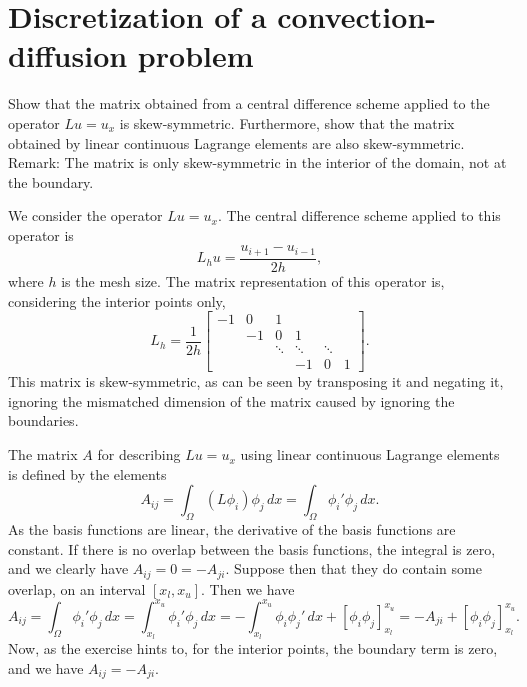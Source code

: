\section{Discretization of a convection-diffusion problem}

\begin{exercise}
    Show that the matrix obtained from a central difference scheme applied to the operator $L u = u_x$ is skew-symmetric.
    Furthermore, show that the matrix obtained by linear continuous Lagrange elements are also skew-symmetric.
    Remark: The matrix is only skew-symmetric in the interior of the domain, not at the boundary.
\end{exercise}

\begin{solution}
    We consider the operator $L u = u_x$.
    The central difference scheme applied to this operator is
    \begin{equation*}
        L_h u = \frac{u_{i+1} - u_{i-1}}{2h},
    \end{equation*}
    where $h$ is the mesh size.
    The matrix representation of this operator is, considering the interior points only,
    \begin{equation*}
        L_h = \frac{1}{2h}
        \begin{bmatrix}
            -1 & 0 & 1 \\
            & -1 & 0 & 1 \\
            && \ddots & \ddots & \ddots \\
            &&& -1 & 0 & 1
        \end{bmatrix}.
    \end{equation*}
    This matrix is skew-symmetric, as can be seen by transposing it and negating it, ignoring the mismatched dimension of the matrix caused by ignoring the boundaries.

    The matrix $A$ for describing $L u = u_x$ using linear continuous Lagrange elements is defined by the elements
    \begin{equation*}
        A_{ij}
        = \int_{\Omega} (L \phi_i) \phi_j \, dx
        = \int_{\Omega} \phi_i' \phi_j \, dx.
    \end{equation*}
    As the basis functions are linear, the derivative of the basis functions are constant.
    If there is no overlap between the basis functions, the integral is zero, and we clearly have $A_{ij} = 0 = -A_{ji}$.
    Suppose then that they do contain some overlap, on an interval $[x_l, x_u]$.
    Then we have
    \begin{equation*}
        A_{ij} = \int_{\Omega} \phi_i' \phi_j \, dx = \int_{x_l}^{x_u} \phi_i' \phi_j \, dx = -\int_{x_l}^{x_u} \phi_i \phi_j' \, dx + \left[ \phi_i \phi_j \right]_{x_l}^{x_u} = -A_{ji} + \left[ \phi_i \phi_j \right]_{x_l}^{x_u}.
    \end{equation*}
    Now, as the exercise hints to, for the interior points, the boundary term is zero, and we have $A_{ij} = -A_{ji}$.
\end{solution}

